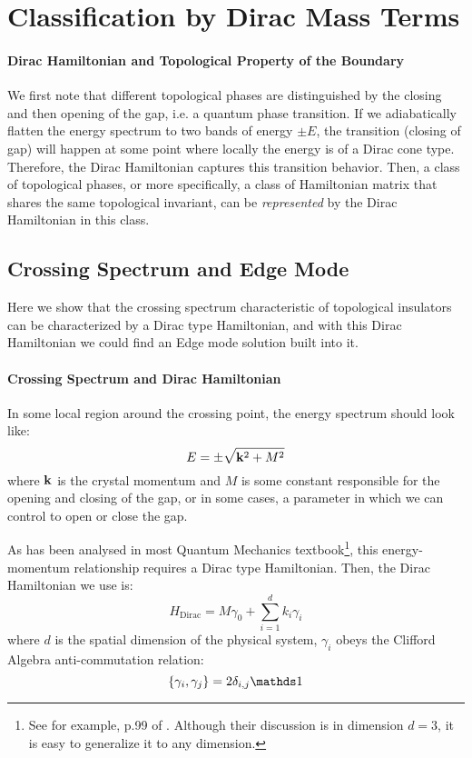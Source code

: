 \section{Classification by Dirac Mass Terms}
\label{sec:The Minimal Hamiltonian Approach}

\paragraph{Dirac Hamiltonian and Topological Property of the Boundary}
We first note that different topological phases are distinguished by the closing
and then opening of the gap, i.e. a quantum phase transition. If we adiabatically
flatten the energy spectrum to two bands of energy $\pm E$, the transition
(closing of gap) will happen at some point where locally the energy is of a
Dirac cone type. Therefore, the Dirac Hamiltonian captures this transition
behavior. Then, a class of topological phases, or more specifically, a class of
Hamiltonian matrix that shares the same topological invariant, can be
\textit{represented} by the Dirac Hamiltonian in this class.

\subsection{Crossing Spectrum and Edge Mode}
\label{sec:Crossing Spectrum and Edge Mode}
Here we show that the crossing spectrum characteristic of topological insulators
can be characterized by a Dirac type Hamiltonian, and with this Dirac
Hamiltonian we could find an Edge mode solution built into it.

\paragraph{Crossing Spectrum and Dirac Hamiltonian}
In some local region around the crossing point, the energy spectrum should look
like:
\begin{equation}
    E = \pm \sqrt{\vb{k}^2 + M^2}
\end{equation}
where $\vb{k}$ is the crystal momentum and $M$ is some constant
responsible for the opening and closing of the gap, or in some cases, a parameter
in which we can control to open or close the gap.

As has been analysed in most Quantum Mechanics textbook\footnote{See for
    example, p.99 of \cite{Greiner1997}. Although their discussion is in
dimension $d=3$, it is easy to generalize it to any dimension.}, this energy-momentum
relationship requires a Dirac type Hamiltonian. Then, the Dirac Hamiltonian we
use is:
\begin{equation}
    \label{eq:dirac-H}
    H_\text{Dirac} = M\gamma_0 + \sum_{i=1}^d k_i\gamma_i
\end{equation}
where $d$ is the spatial dimension of the physical system, $\gamma_i$ obeys the
Clifford Algebra anti-commutation relation:
\begin{equation}
    \{\gamma_i,\gamma_j\} = 2\delta_{i,j}\id
\end{equation}

